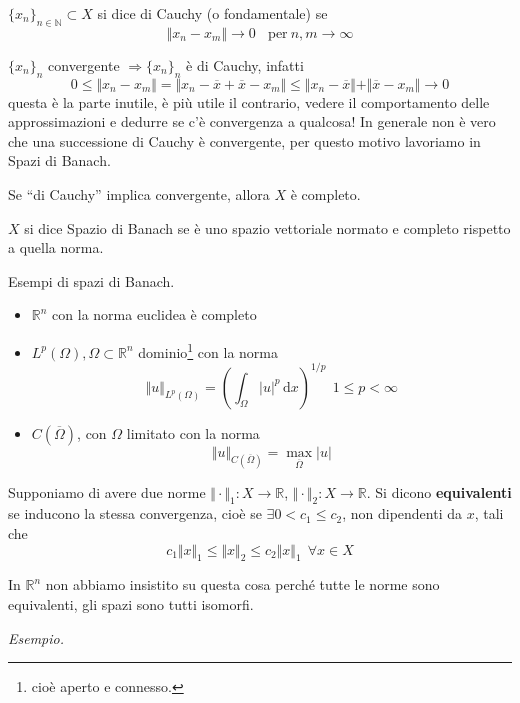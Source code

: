\documentclass[10pt,a4paper,twoside,openright]{book}
\newcommand{\de}{\,\mathrm d}
\newcommand{\dx}{\de x}
\begin{document}
\begin{definition}
    $\{x_{n}\}_{n\in \mathbb{N}} \subset X$ si dice di Cauchy (o fondamentale) se
    \begin{equation*}
        \Vert x_{n} -x_{m}\Vert \rightarrow 0\ \ \ \ \text{per} \ n,m\rightarrow \infty
    \end{equation*}
\end{definition}
$\{x_{n}\}_{n}$ convergente $\Rightarrow \{x_{n}\}_{n}$ è di Cauchy, infatti
\begin{equation*}
    0\leqslant \Vert x_{n} -x_{m}\Vert =\Vert x_{n} -\overline{x} +\overline{x} -x_{m}\Vert \leqslant \Vert x_{n} -\overline{x}\Vert +\Vert \overline{x} -x_{m}\Vert \rightarrow 0
\end{equation*}
questa è la parte inutile, è più utile il contrario, vedere il comportamento delle approssimazioni e dedurre se c'è convergenza a qualcosa! In generale non è vero che una successione di Cauchy è convergente, per questo motivo lavoriamo in Spazi di Banach.
\begin{definition}
    Se ``di Cauchy'' implica convergente, allora $X$ è completo.
\end{definition}
\begin{definition}
    $X$ si dice Spazio di Banach se è uno spazio vettoriale normato e completo rispetto a quella norma.
\end{definition}
Esempi di spazi di Banach.
\begin{itemize}
    \item $\mathbb{R}^{n}$ con la norma euclidea è completo
    \item $L^{p}(\Omega),\Omega \subset \mathbb{R}^{n}$ dominio\footnote{cioè aperto e connesso.} con la norma
          \begin{equation*}
              \Vert u\Vert _{L^{p}(\Omega)} =\left(\int _{\Omega }| u| ^{p} \dx\right)^{1/p} \ \ 1\leqslant p< \infty
          \end{equation*}
    \item $C(\overline{\Omega })$, con $\Omega $ limitato con la norma
          \begin{equation*}
              \Vert u\Vert _{C(\overline{\Omega })} =\max_{\overline{\Omega }}| u|
          \end{equation*}
\end{itemize}
\begin{definition}
    Supponiamo di avere due norme $\Vert \cdotp \Vert _{1} :X\rightarrow \mathbb{R}$, $\Vert \cdotp \Vert _{2} :X\rightarrow \mathbb{R}$. Si dicono \textbf{equivalenti} se inducono la stessa convergenza, cioè se $\exists 0< c_{1} \leqslant c_{2}$, non dipendenti da $x$, tali che
    \begin{equation*}
        c_{1}\Vert x\Vert _{1} \leqslant \Vert x\Vert _{2} \leqslant c_{2}\Vert x\Vert _{1} \ \ \forall x\in X
    \end{equation*}
\end{definition}
\begin{nb}
    In $\mathbb{R}^{n}$ non abbiamo insistito su questa cosa perché tutte le norme sono equivalenti, gli spazi sono tutti isomorfi.
\end{nb}
\textit{Esempio.}
\end{document}
